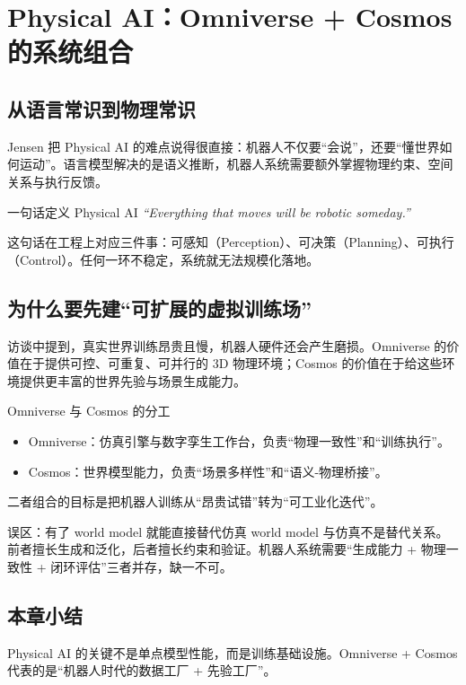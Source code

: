 \section{Physical AI：Omniverse + Cosmos 的系统组合}

\subsection{从语言常识到物理常识}

Jensen 把 Physical AI 的难点说得很直接：机器人不仅要“会说”，还要“懂世界如何运动”。语言模型解决的是语义推断，机器人系统需要额外掌握物理约束、空间关系与执行反馈。

\begin{importantbox}{一句话定义 Physical AI}
\textit{``Everything that moves will be robotic someday.''}

这句话在工程上对应三件事：可感知（Perception）、可决策（Planning）、可执行（Control）。任何一环不稳定，系统就无法规模化落地。
\end{importantbox}

\subsection{为什么要先建“可扩展的虚拟训练场”}

访谈中提到，真实世界训练昂贵且慢，机器人硬件还会产生磨损。Omniverse 的价值在于提供可控、可重复、可并行的 3D 物理环境；Cosmos 的价值在于给这些环境提供更丰富的世界先验与场景生成能力。

\begin{knowledgebox}{Omniverse 与 Cosmos 的分工}
\begin{itemize}
    \item Omniverse：仿真引擎与数字孪生工作台，负责“物理一致性”和“训练执行”。
    \item Cosmos：世界模型能力，负责“场景多样性”和“语义-物理桥接”。
\end{itemize}
二者组合的目标是把机器人训练从“昂贵试错”转为“可工业化迭代”。
\end{knowledgebox}

\begin{warningbox}{误区：有了 world model 就能直接替代仿真}
world model 与仿真不是替代关系。前者擅长生成和泛化，后者擅长约束和验证。机器人系统需要“生成能力 + 物理一致性 + 闭环评估”三者并存，缺一不可。
\end{warningbox}

\subsection{本章小结}
Physical AI 的关键不是单点模型性能，而是训练基础设施。Omniverse + Cosmos 代表的是“机器人时代的数据工厂 + 先验工厂”。

